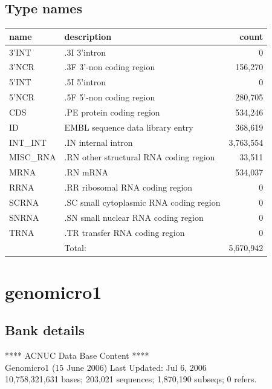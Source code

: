 \documentclass{article}
\begin{document}
\begin{Schunk}
\subsection{Type names}
\noindent\begin{tabular}{llr}
\hline \hline
name & description & count \\
\hline
3'INT  &  .3I 3'intron  &  0 \\
3'NCR  &  .3F  3'-non coding region  &  156,270 \\
5'INT  &  .5I 5'intron  &  0 \\
5'NCR  &  .5F  5'-non coding region  &  280,705 \\
CDS  &  .PE protein coding region  &  534,246 \\
ID  &  EMBL sequence data library entry  &  368,619 \\
INT\_INT  &  .IN  internal intron  &  3,763,554 \\
MISC\_RNA  &  .RN other structural RNA coding region  &  33,511 \\
MRNA  &  .RN mRNA  &  534,037 \\
RRNA  &  .RR ribosomal RNA coding region  &  0 \\
SCRNA  &  .SC small cytoplasmic RNA coding region  &  0 \\
SNRNA  &  .SN small nuclear RNA coding region  &  0 \\
TRNA  &  .TR transfer RNA coding region  &  0 \\
\hline
 & Total: & 5,670,942 \\
\hline \hline
\end{tabular}

\section{ genomicro1 }
\subsection{Bank details}
             ****     ACNUC Data Base Content      ****                         \\
              Genomicro1 (15 June 2006) Last Updated: Jul  6, 2006\\
10,758,321,631 bases; 203,021 sequences; 1,870,190 subseqs; 0 refers.\\
\\
\\



\end{Schunk}
\end{document}

